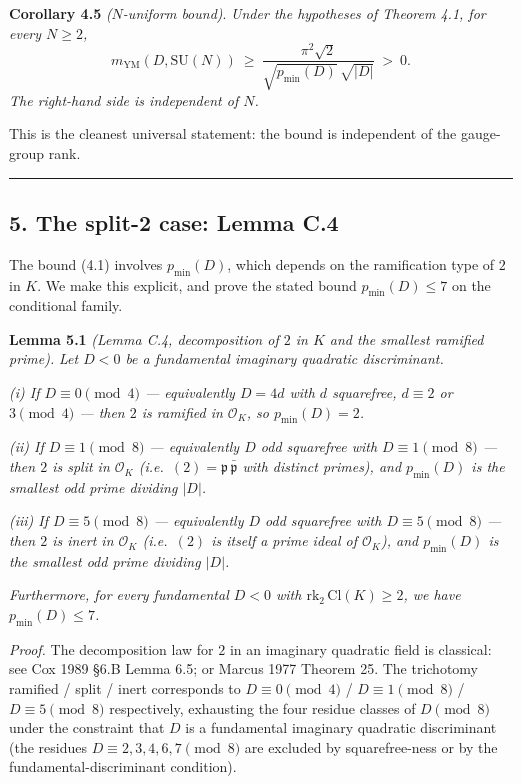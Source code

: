 \documentclass[
  11pt,
  a4paper,
]{amsart}
\begin{document}
\textbf{Corollary 4.5} \emph{(\(N\)-uniform bound)}. \emph{Under the hypotheses of Theorem 4.1, for every \(N \ge 2\),}
\[
m_{\mathrm{YM}}(D, \mathrm{SU}(N))\ \ge\ \frac{\pi^2 \sqrt{2}}{\sqrt{p_{\min}(D)}\,\sqrt{|D|}}\ >\ 0.
\]
\emph{The right-hand side is independent of \(N\).}

This is the cleanest universal statement: the bound is independent of the gauge-group rank.

\begin{center}\rule{0.5\linewidth}{0.5pt}\end{center}

\hypertarget{the-split-2-case-lemma-c.4}{%
\subsection{5. The split-2 case: Lemma C.4}\label{the-split-2-case-lemma-c.4}}

The bound (4.1) involves \(p_{\min}(D)\), which depends on the ramification type of \(2\) in \(K\). We make this explicit, and prove the stated bound \(p_{\min}(D) \le 7\) on the conditional family.

\textbf{Lemma 5.1} \emph{(Lemma C.4, decomposition of \(2\) in \(K\) and the smallest ramified prime).} \emph{Let \(D < 0\) be a fundamental imaginary quadratic discriminant.}

\emph{(i) If \(D \equiv 0 \pmod 4\) --- equivalently \(D = 4d\) with \(d\) squarefree, \(d \equiv 2\) or \(3 \pmod 4\) --- then \(2\) is ramified in \(\mathcal{O}_K\), so \(p_{\min}(D) = 2\).}

\emph{(ii) If \(D \equiv 1 \pmod 8\) --- equivalently \(D\) odd squarefree with \(D \equiv 1 \pmod 8\) --- then \(2\) is split in \(\mathcal{O}_K\) (i.e.~\((2) = \mathfrak{p}\,\bar{\mathfrak{p}}\) with distinct primes), and \(p_{\min}(D)\) is the smallest odd prime dividing \(|D|\).}

\emph{(iii) If \(D \equiv 5 \pmod 8\) --- equivalently \(D\) odd squarefree with \(D \equiv 5 \pmod 8\) --- then \(2\) is inert in \(\mathcal{O}_K\) (i.e.~\((2)\) is itself a prime ideal of \(\mathcal{O}_K\)), and \(p_{\min}(D)\) is the smallest odd prime dividing \(|D|\).}

\emph{Furthermore, for every fundamental \(D < 0\) with \(\mathrm{rk}_2\, \mathrm{Cl}(K) \ge 2\), we have \(p_{\min}(D) \le 7\).}

\emph{Proof.} The decomposition law for \(2\) in an imaginary quadratic field is classical: see Cox 1989 §6.B Lemma 6.5; or Marcus 1977 Theorem 25. The trichotomy ramified / split / inert corresponds to \(D \equiv 0 \pmod 4\) / \(D \equiv 1 \pmod 8\) / \(D \equiv 5 \pmod 8\) respectively, exhausting the four residue classes of \(D \pmod 8\) under the constraint that \(D\) is a fundamental imaginary quadratic discriminant (the residues \(D \equiv 2, 3, 4, 6, 7 \pmod 8\) are excluded by squarefree-ness or by the fundamental-discriminant condition).
\end{document}
